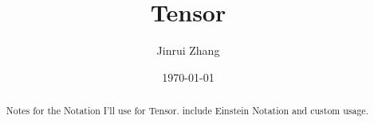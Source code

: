 \documentclass{article}
\title{Tensor}
\author{Jinrui Zhang}
\date{\today}
\begin{document}
\maketitle

\begin{abstract}
    Notes for the Notation I'll use for Tensor.
    include Einstein Notation and custom usage.
    \cite[EinSum]{EinSum}
\end{abstract}

\tableofcontents
\newpage


\end{document}
